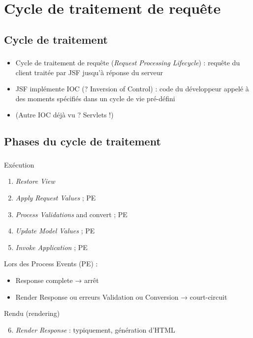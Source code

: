 \documentclass[english, french]{beamer}
\begin{document}
\section[Cycle de traitement]{Cycle de traitement de requête}
\subsection{Cycle de traitement}
\begin{frame}
	\frametitle{\subsecname}
	\begin{itemize}
		\item Cycle de traitement de requête (\emph{Request Processing Lifecycle}) : requête du client {\tiny traitée par JSF} jusqu’à réponse du serveur
		\item JSF implémente IOC (? \pause Inversion of Control) \pause : code du développeur appelé à des moments spécifiés dans un cycle de vie pré-défini
		\item (Autre IOC déjà vu ? \pause Servlets !)
	\end{itemize}
\end{frame}

\subsection{Phases du cycle de traitement}
\begin{frame}
	\frametitle{\subsecname}
	\begin{minipage}[t]{6.8cm}\vspace{-2em}%
		\begin{block}{Exécution}
			\begin{enumerate}
				\item \emph{Restore View}
				\item \emph{Apply Request Values} ; PE
				\item \emph{Process Validations} {\tiny and convert} ; PE
				\item \emph{Update Model Values} ; PE
				\item \emph{Invoke Application} ; PE
			\end{enumerate}
		\end{block}
	\end{minipage}\hfill%
	\begin{minipage}[t]{\columnwidth - 4mm - 6.8cm}
		Lors des Process Events (PE) :
		\begin{itemize}
			\item Response complete → arrêt
			\item Render Response ou erreurs Validation ou Conversion → court-circuit
		\end{itemize}
	\end{minipage}
	\begin{block}{Rendu (rendering)}
		\begin{enumerate}\setcounter{enumi}{5}
			\item \emph{Render Response} : typiquement, génération d’HTML
		\end{enumerate}
	\end{block}
\end{frame}
\end{document}

